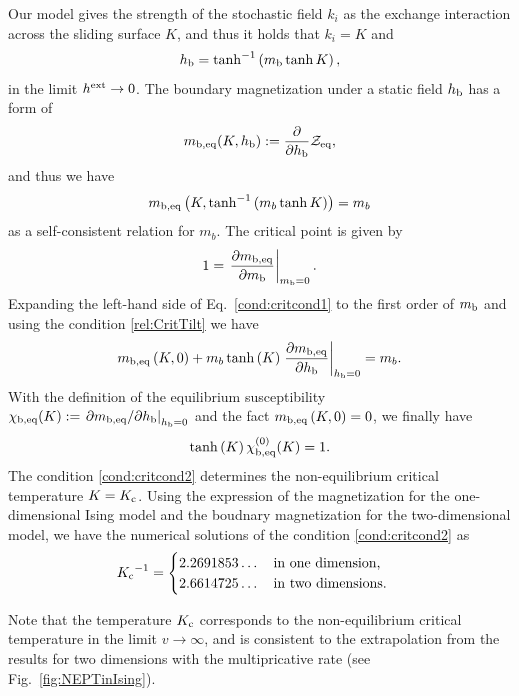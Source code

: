 Our model gives the strength of the stochastic field $k_{i}$ as the exchange interaction across the sliding surface $K$, and thus it holds that $k_{i}=K$ and
\begin{align}
h_{\rm b}=\tanh^{-1}\left(m_{\rm b}\tanh K\right),
\end{align}
in the limit $h^{\rm ext}\to 0$.
The boundary magnetization under a static field $h_{\rm b}$ has a form of
\begin{align}
m_{\rm b, eq}(K,h_{\rm b}):=\frac{\partial}{\partial h_{\rm b}}\mathcal{Z}_{\rm eq},
\end{align}
and thus we have
\begin{align}
m_{\rm b, eq}\left(K,\tanh^{-1}\left(m_{b}\tanh K\right)\right)=m_{b}\label{cond:critcond1}
\end{align}
as a self-consistent relation for $m_{b}$. The critical point is given by
\begin{align}
1=\left.\frac{\partial m_{\rm b,eq}}{\partial m_{\rm b}}\right|_{m_{\rm b}=0}.\label{rel:CritTilt}
\end{align}
Expanding the left-hand side of Eq.~\eqref{cond:critcond1} to the first order of $m_{\rm b}$ and using the condition \eqref{rel:CritTilt} we have
\begin{align}
m_{\rm b,eq}\left(K,0\right) + m_{b}\tanh\left(K\right)\left.\frac{\partial m_{\rm b,eq}}{\partial h_{\rm b}}\right|_{h_{\rm b}=0} = m_{b}.
\end{align}
With the definition of the equilibrium susceptibility $\chi_{\rm b, eq}(K):=\left.\partial m_{\rm b,eq}/\partial h_{\rm b}\right|_{h_{\rm b}=0}$ and the fact $m_{\rm b,eq}\left(K,0\right)=0$, we finally have
\begin{align}
\tanh \left(K\right)\chi^{(0)}_{\rm b, eq}(K) = 1.\label{cond:critcond2}
\end{align}
The condition \eqref{cond:critcond2} determines the non-equilibrium critical temperature $K=K_{\rm c}$. Using the expression of the magnetization for the one-dimensional Ising model and the boudnary magnetization for the two-dimensional model, we have the numerical solutions of the condition \eqref{cond:critcond2} as
\begin{align}
{K_{\rm c}}^{-1} = \begin{cases}
2.2691853\dots\quad\text{in one dimension,}\\
2.6614725\dots\quad\text{in two dimensions.}
\end{cases}
\end{align}

Note that the temperature $K_{\rm c}$ corresponds to the non-equilibrium critical temperature in the limit $v\to\infty$, and is consistent to the extrapolation from the results for two dimensions with the multipricative rate (see Fig.~\ref{fig:NEPTinIsing}).